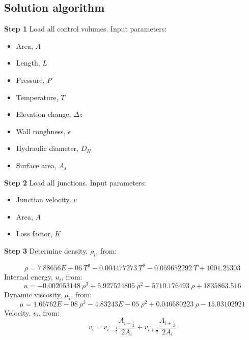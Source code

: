 \documentclass[11pt,letterpaper,titlepage]{article}
\newcommand{\half}{\frac{1}{2}}
\begin{document}
\newpage
\subsection{Solution algorithm}

\textbf{Step 1}\newline
Load all control volumes. Input parameters:
\begin{itemize}
\item Area, $A$
\item Length, $L$
\item Pressure, $P$
\item Temperature, $T$
\item Elevation change, $\Delta z$
\item Wall roughness, $\epsilon$
\item Hydraulic diameter, $D_H$
\item Surface area, $A_s$
\end{itemize}



\vspace{0.5cm}\noindent
\textbf{Step 2}\newline
Load all junctions. Input parameters:
\begin{itemize}
\item Junction velocity, $v$
\item Area, $A$
\item Loss factor, $K$
\end{itemize}






\vspace{0.5cm}\noindent
\textbf{Step 3}\newline
\noindent Determine density, $\rho_i$, from:

\begin{equation*}
\rho=7.88656E-06 \ T^3-0.004477273 \ T^2-0.059652292 \ T+1001.25303
\end{equation*}
\newline
Internal energy, $u_i$, from:
\begin{equation*}
u=-0.002053148 \ \rho^3+5.927524805 \ \rho^2-5710.176493 \ \rho+1835863.516 
\end{equation*}
\newline
Dynamic viscosity, $\mu_i$, from:
\begin{equation*}
\mu=1.66762E-08 \ \rho^3-4.83243E-05 \ \rho^2+0.046680223 \ \rho-15.03102921
\end{equation*}
\newline
Velocity, $v_i$, from:
\begin{equation*}
v_i=v_{i-\half}\frac{A_{i-\half}}{2A_i} + v_{i+\half} \frac{A_{i+\half}}{2A_i}
\end{equation*}
\end{document}
